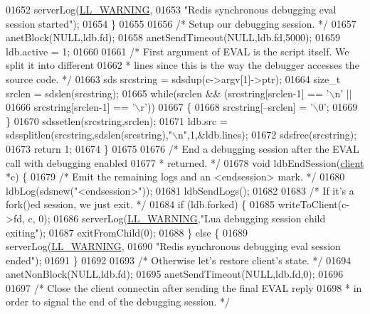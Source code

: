 \begin{DoxyCode}
{{{{{{{{{{{{{01652         serverLog(\hyperlink{server_8h_a31229b9334bba7d6be2a72970967a14b}{LL\_WARNING},
01653             \textcolor{stringliteral}{"Redis synchronous debugging eval session started"});
01654     \}
01655 
01656     \textcolor{comment}{/* Setup our debugging session. */}
01657     anetBlock(NULL,ldb.fd);
01658     anetSendTimeout(NULL,ldb.fd,5000);
01659     ldb.active = 1;
01660 
01661     \textcolor{comment}{/* First argument of EVAL is the script itself. We split it into different}
01662 \textcolor{comment}{     * lines since this is the way the debugger accesses the source code. */}
01663     sds srcstring = sdsdup(c->argv[1]->ptr);
01664     size\_t srclen = sdslen(srcstring);
01665     \textcolor{keywordflow}{while}(srclen && (srcstring[srclen-1] == \textcolor{stringliteral}{'\(\backslash\)n'} ||
01666                      srcstring[srclen-1] == \textcolor{stringliteral}{'\(\backslash\)r'}))
01667     \{
01668         srcstring[--srclen] = \textcolor{stringliteral}{'\(\backslash\)0'};
01669     \}
01670     sdssetlen(srcstring,srclen);
01671     ldb.src = sdssplitlen(srcstring,sdslen(srcstring),\textcolor{stringliteral}{"\(\backslash\)n"},1,&ldb.lines);
01672     sdsfree(srcstring);
01673     \textcolor{keywordflow}{return} 1;
01674 \}
01675 
01676 \textcolor{comment}{/* End a debugging session after the EVAL call with debugging enabled}
01677 \textcolor{comment}{ * returned. */}
01678 \textcolor{keywordtype}{void} ldbEndSession(\hyperlink{structclient}{client} *c) \{
01679     \textcolor{comment}{/* Emit the remaining logs and an <endsession> mark. */}
01680     ldbLog(sdsnew(\textcolor{stringliteral}{"<endsession>"}));
01681     ldbSendLogs();
01682 
01683     \textcolor{comment}{/* If it's a fork()ed session, we just exit. */}
01684     \textcolor{keywordflow}{if} (ldb.forked) \{
01685         writeToClient(c->fd, c, 0);
01686         serverLog(\hyperlink{server_8h_a31229b9334bba7d6be2a72970967a14b}{LL\_WARNING},\textcolor{stringliteral}{"Lua debugging session child exiting"});
01687         exitFromChild(0);
01688     \} \textcolor{keywordflow}{else} \{
01689         serverLog(\hyperlink{server_8h_a31229b9334bba7d6be2a72970967a14b}{LL\_WARNING},
01690             \textcolor{stringliteral}{"Redis synchronous debugging eval session ended"});
01691     \}
01692 
01693     \textcolor{comment}{/* Otherwise let's restore client's state. */}
01694     anetNonBlock(NULL,ldb.fd);
01695     anetSendTimeout(NULL,ldb.fd,0);
01696 
01697     \textcolor{comment}{/* Close the client connectin after sending the final EVAL reply}
01698 \textcolor{comment}{     * in order to signal the end of the debugging session. */}
}}}}}}}}}}}}}
\end{DoxyCode}
